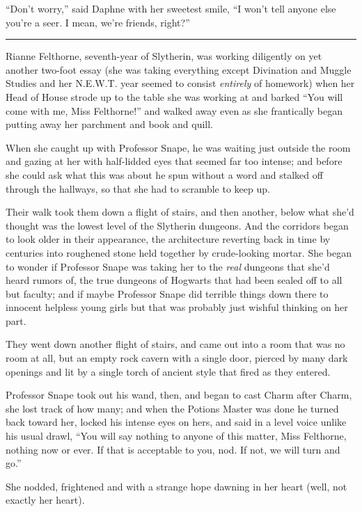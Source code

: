 ``Don't worry,'' said Daphne with her sweetest smile, ``I won't tell anyone else you're a seer. I mean, we're friends, right?''

\begin{center}\rule{3in}{0.4pt}\end{center}

Rianne Felthorne, seventh-year of Slytherin, was working diligently on yet another two-foot essay (she was taking everything except Divination and Muggle Studies and her N.E.W.T. year seemed to consist \emph{entirely} of homework) when her Head of House strode up to the table she was working at and barked ``You will come with me, Miss Felthorne!'' and walked away even as she frantically began putting away her parchment and book and quill.

When she caught up with Professor Snape, he was waiting just outside the room and gazing at her with half-lidded eyes that seemed far too intense; and before she could ask what this was about he spun without a word and stalked off through the hallways, so that she had to scramble to keep up.

Their walk took them down a flight of stairs, and then another, below what she'd thought was the lowest level of the Slytherin dungeons. And the corridors began to look older in their appearance, the architecture reverting back in time by centuries into roughened stone held together by crude-looking mortar. She began to wonder if Professor Snape was taking her to the \emph{real} dungeons that she'd heard rumors of, the true dungeons of Hogwarts that had been sealed off to all but faculty; and if maybe Professor Snape did terrible things down there to innocent helpless young girls but that was probably just wishful thinking on her part.

They went down another flight of stairs, and came out into a room that was no room at all, but an empty rock cavern with a single door, pierced by many dark openings and lit by a single torch of ancient style that fired as they entered.

Professor Snape took out his wand, then, and began to cast Charm after Charm, she lost track of how many; and when the Potions Master was done he turned back toward her, locked his intense eyes on hers, and said in a level voice unlike his usual drawl, ``You will say nothing to anyone of this matter, Miss Felthorne, nothing now or ever. If that is acceptable to you, nod. If not, we will turn and go.''

She nodded, frightened and with a strange hope dawning in her heart (well, not exactly her heart).

